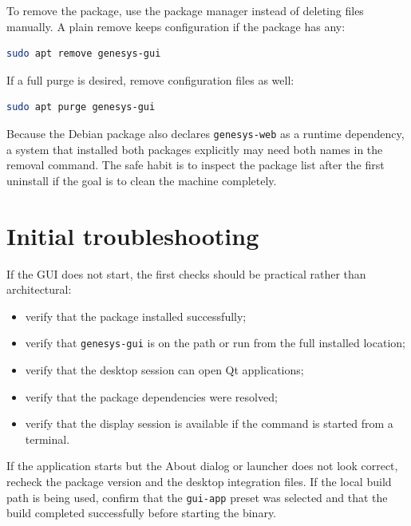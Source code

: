 To remove the package, use the package manager instead of deleting files
manually. A plain remove keeps configuration if the package has any:

\begin{lstlisting}[language=bash,caption={Removing the GenESyS package},label={lst:user-installation-remove}]
sudo apt remove genesys-gui
\end{lstlisting}

If a full purge is desired, remove configuration files as well:

\begin{lstlisting}[language=bash,caption={Purging the GenESyS package},label={lst:user-installation-purge}]
sudo apt purge genesys-gui
\end{lstlisting}

Because the Debian package also declares \texttt{genesys-web} as a runtime
dependency, a system that installed both packages explicitly may need both names
in the removal command. The safe habit is to inspect the package list after the
first uninstall if the goal is to clean the machine completely.

\section{Initial troubleshooting}
\label{sec:user-installation-troubleshooting}

If the GUI does not start, the first checks should be practical rather than
architectural:
\begin{itemize}
\item verify that the package installed successfully;
\item verify that \texttt{genesys-gui} is on the path or run from the full
  installed location;
\item verify that the desktop session can open Qt applications;
\item verify that the package dependencies were resolved;
\item verify that the display session is available if the command is started
from a terminal.
\end{itemize}

If the application starts but the About dialog or launcher does not look
correct, recheck the package version and the desktop integration files. If the
local build path is being used, confirm that the \texttt{gui-app} preset was
selected and that the build completed successfully before starting the binary.

